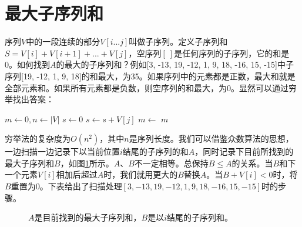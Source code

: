 \documentclass[b5paper]{ctexart}
\begin{document}
\section{最大子序列和}

序列$V$中的一段连续的部分$V[i...j]$叫做子序列。定义子序列和$S = V[i] + V[i+1] + ... + V[j]$，空序列$[\ ]$是任何序列的子序列，它的和是0。如何找到$A$的最大的子序列和\cite{Bentley}？例如[3, -13, 19, -12, 1, 9, 18, -16, 15, -15]中子序列[19, -12, 1, 9, 18]的和最大，为35。如果序列中的元素都是正数，最大和就是全部元素和。如果所有元素都是负数，则空序列的和最大，为0。显然可以通过穷举找出答案：

\begin{algorithmic}[1]
  \State $m \gets 0, n \gets |V|$
    \State $s \gets 0$
      \State $s \gets s + V[j]$
      \State $m \gets $ 
    \EndFor
  \EndFor
  \State \Return $m$
\EndFunction
\end{algorithmic}

穷举法的复杂度为$O(n^2)$，其中$n$是序列长度。我们可以借鉴众数算法的思想，一边扫描一边记录下以当前位置$i$结尾的子序列的和$A$，同时记录下目前所找到的最大子序列和$B$，如图\ref{fig:max-sum-invariant}所示。$A$、$B$不一定相等。总保持$B \leq A$的关系。当$B$和下一个元素$V[i]$相加后超过$A$时，我们就用更大的$B$替换$A$。当$B + V[i] < 0$时，将$B$重置为0。下表给出了扫描处理$[3, -13, 19, -12, 1, 9, 18, -16, 15, -15]$时的步骤。

\begin{figure}[htbp]
 \centering
 \caption{$A$是目前找到的最大子序列和，$B$是以$i$结尾的子序列和。}
 \label{fig:max-sum-invariant}
\end{figure}
\end{document}
